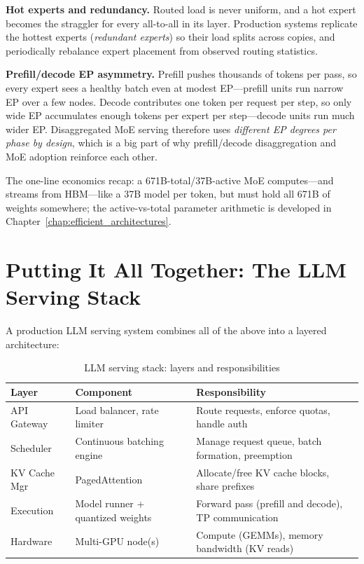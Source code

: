 \textbf{Hot experts and redundancy.} Routed load is never uniform, and a hot expert becomes the straggler for every all-to-all in its layer. Production systems replicate the hottest experts (\textit{redundant experts}) so their load splits across copies, and periodically rebalance expert placement from observed routing statistics.

\textbf{Prefill/decode EP asymmetry.} Prefill pushes thousands of tokens per pass, so every expert sees a healthy batch even at modest EP---prefill units run narrow EP over a few nodes. Decode contributes one token per request per step, so only wide EP accumulates enough tokens per expert per step---decode units run much wider EP. Disaggregated MoE serving therefore uses \textit{different EP degrees per phase by design}, which is a big part of why prefill/decode disaggregation and MoE adoption reinforce each other.

The one-line economics recap: a 671B-total/37B-active MoE computes---and streams from HBM---like a 37B model per token, but must hold all 671B of weights somewhere; the active-vs-total parameter arithmetic is developed in Chapter~\ref{chap:efficient_architectures}.

\section{Putting It All Together: The LLM Serving Stack}
\label{sec:serving_stack}

A production LLM serving system combines all of the above into a layered architecture:

\begin{table}[H]
\centering
\caption{LLM serving stack: layers and responsibilities}
\begin{tabularx}{\textwidth}{llX}
\toprule
\textbf{Layer} & \textbf{Component} & \textbf{Responsibility} \\
\midrule
API Gateway & Load balancer, rate limiter & Route requests, enforce quotas, handle auth \\
Scheduler & Continuous batching engine & Manage request queue, batch formation, preemption \\
KV Cache Mgr & PagedAttention & Allocate/free KV cache blocks, share prefixes \\
Execution & Model runner + quantized weights & Forward pass (prefill and decode), TP communication \\
Hardware & Multi-GPU node(s) & Compute (GEMMs), memory bandwidth (KV reads) \\
\bottomrule
\end{tabularx}
\end{table}

